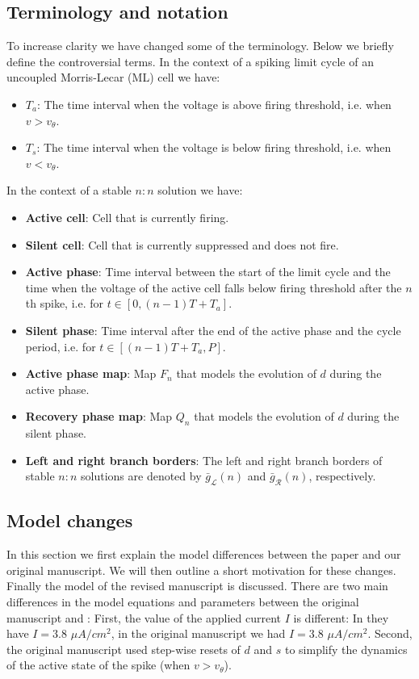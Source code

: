 \documentclass[utf8]{article}
\begin{document}
\subsection{Terminology and notation}
\label{sec:terminology}
To increase clarity we have changed some of the terminology.
Below we briefly define the controversial terms.
In the context of a spiking limit cycle of an uncoupled Morris-Lecar (ML) cell we have:
\begin{itemize}
	\item $T_{a}$: The time interval when the voltage is above firing threshold, i.e. when $v>v_{\theta}$.
	\item $T_{s}$: The time interval when the voltage is below firing threshold, i.e. when $v<v_{\theta}$.
\end{itemize}
In the context of a stable $n:n$ solution we have:
\begin{itemize}
	\item \textbf{Active cell}: Cell that is currently firing.
	\item \textbf{Silent cell}: Cell that is currently suppressed and does not fire.
	\item \textbf{Active phase}: Time interval between the start of the limit cycle and the time when the voltage of the active cell falls below firing threshold after the $n$th spike, i.e. for $t \in \left[0, (n-1)T + T_{a}\right]$.
	\item \textbf{Silent phase}: Time interval after the end of the active phase and the cycle period, i.e. for $t \in \left[(n-1)T + T_{a}, P\right]$.
	\item \textbf{Active phase map}: Map $F_{n}$ that models the evolution of $d$ during the active phase.
	\item \textbf{Recovery phase map}: Map $Q_{n}$ that models the evolution of $d$ during the silent phase.
	\item \textbf{Left and right branch borders}: The left and right branch borders of stable $n:n$ solutions are denoted by $\bar g_{\mathcal{L}}(n)$ and $\bar g_{\mathcal{R}}(n)$, respectively.
\end{itemize}

\subsection{Model changes}
\label{sec:model}
In this section we first explain the model differences between the \cite{bose2011} paper and our original manuscript.
We will then outline a short motivation for these changes.
Finally the model of the revised manuscript is discussed.
There are two main differences in the model equations and parameters between the original manuscript and \cite{bose2011}:
First, the value of the applied current $I$ is different: In \cite{bose2011} they have $I=3.8$ $\si{\mu A/cm^2}$, in the original manuscript we had $I=3.8$ $\si{\mu A/cm^2}$.
Second, the original manuscript used step-wise resets of $d$ and $s$ to simplify the dynamics of the active state of the spike (when $v > v_{\theta}$).
\end{document}
